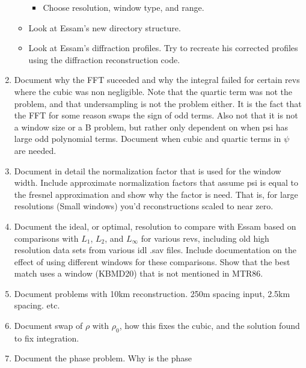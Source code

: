 \documentclass[crop=false,class=article,oneside]{standalone}
\begin{document}
\begin{enumerate}
\begin{itemize}
\begin{itemize}
                    \item Choose resolution, window type, and range.
                \end{itemize}
                \item Look at Essam's new directory structure.
                \item Look at Essam's diffraction profiles. Try to recreate his corrected profiles using the diffraction reconstruction code.
            \end{itemize}
            \item Document why the FFT suceeded and why the
                  integral failed for certain revs where the cubic was
                  non negligible. Note that the quartic term was not
                  the problem, and that undersampling is not the
                  problem either. It is the fact that the FFT for
                  some reason swaps the sign of odd terms. Also not
                  that it is not a window size or a B problem, but
                  rather only dependent on when psi has large odd
                  polynomial terms. Document when cubic and quartic
                  terms in $\psi$ are needed.
            \item Document in detail the normalization factor that
                  is used for the window width. Include approximate
                  normalization factors that assume psi is equal to
                  the fresnel approximation and show why the factor
                  is need. That is, for large resolutions
                  (Small windows) you'd reconstructions scaled
                  to near zero.
            \item Document the ideal, or optimal, resolution to compare
                  with Essam based on comparisons with $L_{1}$,
                  $L_{2}$, and $L_{\infty}$ for various revs, including
                  old high resolution data sets from various idl .sav
                  files. Include documentation on the effect of using
                  different windows for these comparisons. Show that
                  the best match uses a window (KBMD20) that is not
                  mentioned in MTR86.
            \item Document problems with 10km reconstruction.
                  250m spacing input, 2.5km spacing. etc.
            \item Document swap of $\rho$ with $\rho_{0}$, how this fixes
                  the cubic, and the solution found to fix integration.
            \item Document the phase problem. Why is the phase

\end{enumerate}
\end{document}
